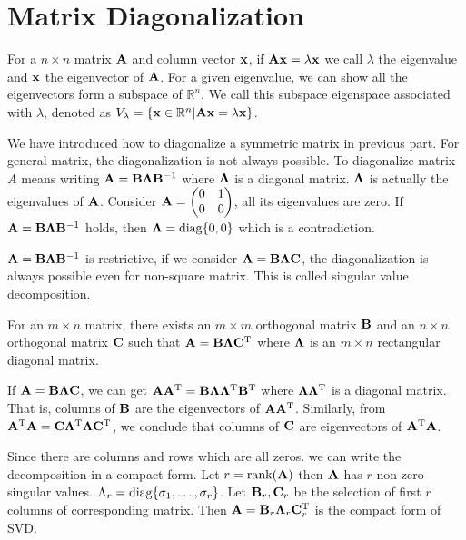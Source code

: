 \section{Matrix Diagonalization}
For a $n\times n$ matrix $\mathbf{A}$ and column vector $\mathbf{x}$, if $\mathbf{A} \mathbf{x} = \lambda \mathbf{x}$ we call $\lambda$ the eigenvalue and $\mathbf{x}$ the eigenvector of $\mathbf{A}$. For a given eigenvalue, we can show all the eigenvectors form a subspace of $\mathbb{R}^n$.  We call this subspace eigenspace associated with $\lambda$, denoted as $V_{\lambda}=\{\mathbf{x} \in \mathbb{R}^n | \mathbf{A}\mathbf{x} = \lambda \mathbf{x} \}$.

We have introduced how to diagonalize a symmetric matrix in previous part. For general matrix, the diagonalization is not always possible. 
To diagonalize matrix $A$ means writing $\mathbf{A} = \mathbf{B} \mathbf{\Lambda} \mathbf{B}^{-1}$ where $\mathbf{\Lambda}$ is a diagonal matrix. $\mathbf{\Lambda}$ is actually the eigenvalues of $\mathbf{A}$. Consider
$\mathbf{A}=\begin{pmatrix} 0 & 1 \\ 0 & 0 \end{pmatrix}$, all its eigenvalues are zero. If $\mathbf{A} = \mathbf{B} \mathbf{\Lambda} \mathbf{B}^{-1}$ holds, then $\mathbf{\Lambda} = \operatorname{diag}\{0,0\}$ which is a contradiction.

$\mathbf{A} = \mathbf{B} \mathbf{\Lambda} \mathbf{B}^{-1}$ is restrictive, if we consider $\mathbf{A} = \mathbf{B} \mathbf{\Lambda} \mathbf{C}$, the diagonalization is always possible even for non-square matrix. This is called singular value decomposition.
\begin{theorem}
	For an $m\times n$ matrix, there exists an $m\times m$ orthogonal matrix $\mathbf{B}$ and an $n \times n$ orthogonal matrix $\mathbf{C}$ such that $\mathbf{A} = \mathbf{B} \mathbf{\Lambda} \mathbf{C}^{\mathrm{T}}$ where $\mathbf{\Lambda}$ is an $m \times n$ rectangular diagonal matrix.
\end{theorem}
If $\mathbf{A} = \mathbf{B} \mathbf{\Lambda} \mathbf{C}$, we can get $\mathbf{A}\mathbf{A}^{\mathrm{T}} = \mathbf{B} \mathbf{\Lambda}\mathbf{\Lambda}^{\mathrm{T}} \mathbf{B}^{\mathrm{T}}$ where $\mathbf{\Lambda}\mathbf{\Lambda}^{\mathrm{T}}$ is a diagonal matrix. That is, columns of $\mathbf{B}$ are the eigenvectors of $\mathbf{A}\mathbf{A}^{\mathrm{T}}$. Similarly, from $\mathbf{A}^{\mathrm{T}} \mathbf{A} = \mathbf{C} \mathbf{\Lambda}^{\mathrm{T}} \mathbf{\Lambda} \mathbf{C}^{\mathrm{T}}$, we conclude that columns of $\mathbf{C}$ are eigenvectors of $\mathbf{A}^{\mathrm{T}} \mathbf{A}$.

Since there are columns and rows which are all zeros. we can write the decomposition in a compact form. Let $r = \textrm{rank}(\mathbf{A})$ then $\mathbf{A}$ has $r$ non-zero singular values. $\Lambda_r = \operatorname{diag}\{\sigma_1, \dots, \sigma_r\}$. Let $\mathbf{B}_r, \mathbf{C}_r$ be the selection of first $r$ columns of corresponding matrix. Then $\mathbf{A} = \mathbf{B}_r \mathbf{\Lambda}_r \mathbf{C}_r^{\mathrm{T}}$ is the compact form of SVD.
